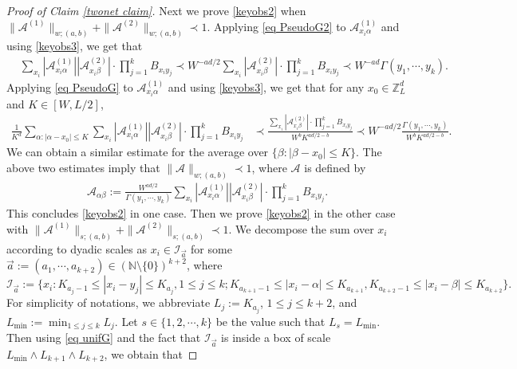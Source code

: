 \documentclass{article}
\newcommand{\1}{\mathds{1}}
\numberwithin{equation}{section}
\newcommand{\al}{\alpha}
\newcommand{\be}{\begin{equation}}
\newcommand{\ee}{\end{equation}}
\renewcommand{\cal}{\mathcal}
\renewcommand{\leq}{\leqslant}
\renewcommand{\le}{\leq}
\newcommand{\N}{\mathbb{N}}
\newcommand{\Z}{\mathbb{Z}}
\theoremstyle{plain} %
\theoremstyle{remark}
\begin{document}
\begin{proof}[Proof of Claim \ref{twonet claim}]
Next we prove \eqref{keyobs2} when $\|\cal A^{(1)}\|_{w;(a,b)}+ \|\cal A^{(2)}\|_{w;(a,b)}\prec 1$.
Applying \eqref{eq PseudoG2} to $\cal A^{(1)}_{x_i\al}$ and using \eqref{keyobs3}, we get that
\begin{align*}
& %
\sum_{x_i} |\cal A^{(1)}_{x_i \al}|  |\cal A^{(2)} _{x_i \beta}|\cdot \prod_{j=1}^k B_{x_i y_j } 
\prec W^{-ad/2}\sum_{x_i }  |\cal A^{(2)} _{x_i \beta}|\cdot \prod_{j=1}^k B_{x_i y_j }  \prec W^{-ad }\Gamma(y_1,\cdots, y_k).
\end{align*}
Applying \eqref{eq PseudoG} to $\cal A^{(1)}_{x_i\al}$ and using \eqref{keyobs3}, we get that for any $x_0\in \Z_L^d$ and $  K \in [W, L/2]$,
\begin{align*}
 \frac{1}{K^d}\sum_{\al: |\al - x_0|\le K}\sum_{x_i} |\cal A^{(1)}_{x_i \al}|  |\cal A^{(2)} _{x_i \beta}|\cdot \prod_{j=1}^k B_{x_i y_j }  & \prec \frac{\sum_{x_i } |\cal A^{(2)} _{x_i \beta}|\cdot  \prod_{j=1}^k B_{x_i y_j } }{W^{b}K^{ad/2-b}}  \prec W^{-ad/2} \frac{\Gamma(y_1,\cdots, y_k)}{W^{b}K^{ad/2-b}}. 
\end{align*} 
We can obtain a similar estimate for the average over $\{\beta:|\beta-x_0|\le K\}$. The above two estimates imply that $  \|\cal A\|_{w;(a,b)}\prec 1$, where $\cal A$ is defined by
\be\label{keyobs_add}
\begin{split}
	{\cal A}_{\al\beta}:=\frac{W^{ad/2 }}{\Gamma(y_1,\cdots, y_k)}\sum_{x_i} |\cal A^{(1)}_{x_i \al}|  |\cal A^{(2)} _{x_i \beta}|\cdot \prod_{j=1}^k B_{x_i y_j } . 
\end{split}
\ee
This concludes \eqref{keyobs2} in one case.
Then we prove \eqref{keyobs2} in the other case with $\|\cal A^{(1)}\|_{s;(a,b)}+ \|\cal A^{(2)}\|_{s;(a,b)}\prec 1$. We decompose the sum over $x_i$ according to dyadic scales as $x_i \in \cal I_{\vec a}$ for some $\vec a:=(a_1, \cdots, a_{k+2})\in (\N\setminus\{0\})^{k+2}$, where 
$$\cal I_{\vec a}:=\{ x_i: K_{a_j-1} \le |x_i - y_j| \le K_{a_j} ,  1\le j \le k; K_{a_{k+1}-1} \le |x_i-\al|\le K_{a_{k+1}}, K_{a_{k+2}-1} \le |x_i-\beta|\le K_{a_{k+2}}\}.$$ For simplicity of notations, we abbreviate $L_j := K_{a_j}$, $1\le j \le k+2$, and $L_{\min}:=\min_{1\le j \le k}L_j$. Let $s \in \{1,2,\cdots, k\}$ be the value such that $L_s=L_{\min}$. Then using \eqref{eq unifG} and the fact that $\cal I_{\vec a}$ is inside a box of scale $L_{\min}\wedge L_{k+1}\wedge L_{k+2}$, we obtain that 

\end{proof}
\end{document}
